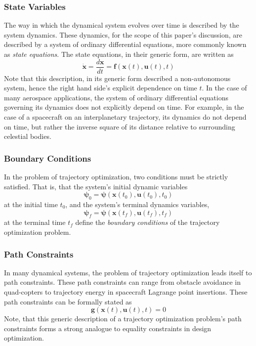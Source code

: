 \documentclass{article}
\begin{document}
\subsubsection{State Variables}
The way in which the dynamical system evolves over time is described by the system dynamics. These dynamics, for the scope of this paper's discussion, are described by a system of ordinary differential equations, more commonly known as \textit{state equations}. The state equations, in their generic form, are written as
$$
\dot{\mathbf{x}} = \frac{d\mathbf{x}}{dt} = \mathbf{f}(\mathbf{x}(t),\mathbf{u}(t),t)
$$
Note that this description, in its generic form described a non-autonomous system, hence the right hand side's explicit dependence on time $t$. In the case of many aerospace applications, the system of ordinary differential equations governing its dynamics does not explicitly depend on time. For example, in the case of a spacecraft on an interplanetary trajectory, its dynamics do not depend on time, but rather the inverse square of its distance relative to surrounding celestial bodies.

\subsubsection{Boundary Conditions}
In the problem of trajectory optimization, two conditions must be strictly satisfied. That is, that the system's initial dynamic variables
$$
\mathbf{\psi}_0 = \mathbf{\psi}(\mathbf{x}(t_0),\mathbf{u}(t_0),t_0)
$$
at the initial time $t_0$, and the system's terminal dynamics variables,
$$
\mathbf{\psi}_f = \mathbf{\psi}(\mathbf{x}(t_f),\mathbf{u}(t_f),t_f)
$$
at the terminal time $t_f$ define the \textit{boundary conditions} of the trajectory optimization problem.

\subsubsection{Path Constraints}
In many dynamical systems, the problem of trajectory optimization leads itself to path constraints. These path constraints can range from obstacle avoidance in quad-copters to trajectory energy in spacecraft Lagrange point insertions. These path constraints can be formally stated as 
$$
\mathbf{g}(\mathbf{x}(t),\mathbf{u}(t),t) = 0
$$
Note, that this generic description of a trajectory optimization problem's path constraints forms a strong analogue to equality constraints in design optimization.
\end{document}
